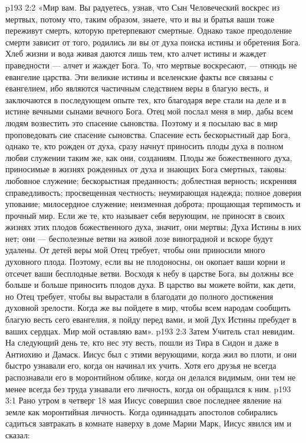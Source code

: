 \vs p193 2:2 \pc «Мир вам. Вы радуетесь, узнав, что Сын Человеческий воскрес из мертвых, потому что, таким образом, знаете, что и вы и братья ваши тоже переживут смерть, которую претерпевают смертные. Однако такое преодоление смерти зависит от того, родились ли вы от духа поиска истины и обретения Бога. Хлеб жизни и вода живая даются лишь тем, кто алчет истины и жаждет праведности --- алчет и жаждет Бога. То, что мертвые воскресают, --- отнюдь не евангелие царства. Эти великие истины и вселенские факты все связаны с евангелием, ибо являются частичным следствием веры в благую весть, и заключаются в последующем опыте тех, кто благодаря вере стали на деле и в истине вечными сынами вечного Бога. Отец мой послал меня в мир, дабы всем людям возвестить это спасение сыновства. Поэтому и я посылаю вас в мир проповедовать сие спасение сыновства. Спасение есть бескорыстный дар Бога, однако те, кто рожден от духа, сразу начнут приносить плоды духа в полном любви служении таким же, как они, созданиям. Плоды же божественного духа, приносимые в жизнях рожденных от духа и знающих Бога смертных, таковы: любовное служение; бескорыстная преданность; доблестная верность; искренняя справедливость; просвещенная честность; неумирающая надежда; полное доверия упование; милосердное служение; неизменная доброта; прощающая терпимость и прочный мир. Если же те, кто называет себя верующим, не приносят в своих жизнях этих плодов божественного духа, значит, они мертвы; Духа Истины в них нет; они --- бесполезные ветви на живой лозе виноградной и вскоре будут удалены. От детей веры мой Отец требует, чтобы они приносили много духовного плода. Поэтому, если вы не плодоносны, он окопает ваши корни и отсечет ваши бесплодные ветви. Восходя к небу в царстве Бога, вы должны все больше и больше приносить плодов духа. В царство вы можете войти, как дети, но Отец требует, чтобы вы вырастали в благодати до полного достижения духовной зрелости. Когда же вы пойдете в мир, чтобы всем народам сообщить благую весть сего евангелия, я пойду перед вами, и мой Дух Истины пребудет в ваших сердцах. Мир мой оставляю вам».
\vs p193 2:3 \pc Затем Учитель стал невидим. На следующий день те, кто нес эту весть, пошли из Тира в Сидон и даже в Антиохию и Дамаск. Иисус был с этими верующими, когда жил во плоти, и они быстро узнавали его, когда он начинал их учить. Хотя его друзья не всегда распознавали его в моронтийном облике, когда он делался видимым, они тем не менее всегда без труда узнавали его личность, когда он обращался к ним.
\vs p193 3:1 Рано утром в четверг 18 мая Иисус совершил свое последнее явление на земле как моронтийная личность. Когда одиннадцать апостолов собирались садиться завтракать в комнате наверху в доме Марии Марк, Иисус явился им и сказал:
